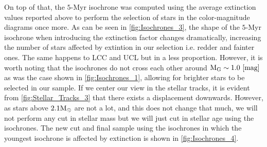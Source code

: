 On top of that, the $5$-Myr isochrone was computed using the average extinction values reported above to perform the selection of stars in the color-magnitude diagrams once more. As can be seen in \autoref{fig:Isochrones_3}, the shape of the $5$-Myr isochrone when introducing the extinction factor changes dramatically, increasing the number of stars affected by extintion in our selection i.e. redder and fainter ones. The same happens to LCC and UCL but in a less proportion. However, it is worth noting that the isochrones do not cross each other around $\textnormal{M}_\textnormal{G} \sim 1.0~[\textnormal{mag}]$ as was the case shown in \autoref{fig:Isochrones_1}, allowing for brighter stars to be selected in our sample. If we center our view in the stellar tracks, it is evident from \autoref{fig:Stellar_Tracks_3} that there exists a displacement downwards. However, as stars above $2.1 \textnormal{M}_\odot$ are not a lot, and this does not change that much, we will not perform any cut in stellar mass but we will just cut in stellar age using the isochrones. The new cut and final sample using the isochrones in which the youngest isochrone is affected by extinction is shown in \autoref{fig:Isochrones_4}.\\ 

